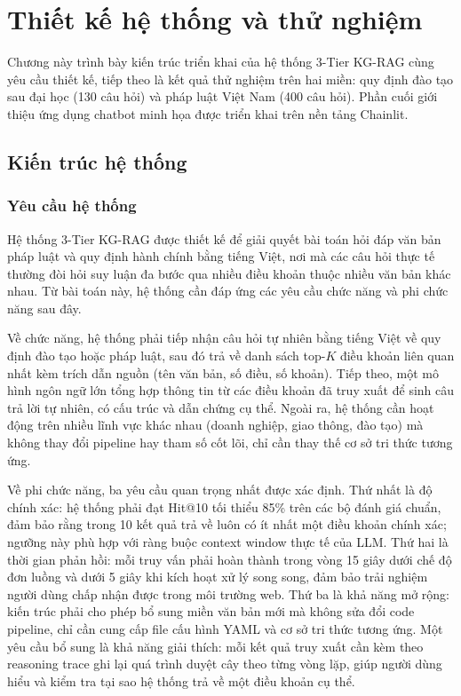 \chapter{Thiết kế hệ thống và thử nghiệm}
\label{chap:chapter4}

Chương này trình bày kiến trúc triển khai của hệ thống 3-Tier KG-RAG cùng yêu cầu
thiết kế, tiếp theo là kết quả thử nghiệm trên hai miền: quy định đào tạo sau đại học (130
câu hỏi) và pháp luật Việt Nam (400 câu hỏi). Phần cuối giới thiệu ứng dụng chatbot
minh họa được triển khai trên nền tảng Chainlit.

\section{Kiến trúc hệ thống}
\label{sec:kien-truc-he-thong}

\subsection{Yêu cầu hệ thống}
\label{subsec:yeu-cau-he-thong}

Hệ thống 3-Tier KG-RAG được thiết kế để giải quyết bài toán hỏi đáp văn bản pháp
luật và quy định hành chính bằng tiếng Việt, nơi mà các câu hỏi thực tế thường đòi hỏi
suy luận đa bước qua nhiều điều khoản thuộc nhiều văn bản khác nhau. Từ bài toán này,
hệ thống cần đáp ứng các yêu cầu chức năng và phi chức năng sau đây.

Về chức năng, hệ thống phải tiếp nhận câu hỏi tự nhiên bằng tiếng Việt về quy định
đào tạo hoặc pháp luật, sau đó trả về danh sách top-$K$ điều khoản liên quan nhất kèm
trích dẫn nguồn (tên văn bản, số điều, số khoản). Tiếp theo, một mô hình ngôn ngữ lớn
tổng hợp thông tin từ các điều khoản đã truy xuất để sinh câu trả lời tự nhiên, có cấu
trúc và dẫn chứng cụ thể. Ngoài ra, hệ thống cần hoạt động trên nhiều lĩnh vực khác
nhau (doanh nghiệp, giao thông, đào tạo) mà không thay đổi pipeline hay tham số
cốt lõi, chỉ cần thay thế cơ sở tri thức tương ứng.

Về phi chức năng, ba yêu cầu quan trọng nhất được xác định. Thứ nhất là độ chính
xác: hệ thống phải đạt Hit@10 tối thiểu 85\% trên các bộ đánh giá chuẩn, đảm bảo
rằng trong 10 kết quả trả về luôn có ít nhất một điều khoản chính xác; ngưỡng này phù
hợp với ràng buộc context window thực tế của LLM. Thứ hai là thời gian phản hồi:
mỗi truy vấn phải hoàn thành trong vòng 15 giây dưới chế độ đơn luồng và dưới 5 giây
khi kích hoạt xử lý song song, đảm bảo trải nghiệm người dùng chấp nhận được trong
môi trường web. Thứ ba là khả năng mở rộng: kiến trúc phải cho phép bổ sung miền
văn bản mới mà không sửa đổi code pipeline, chỉ cần cung cấp file cấu hình YAML và
cơ sở tri thức tương ứng. Một yêu cầu bổ sung là khả năng giải thích: mỗi kết quả truy
xuất cần kèm theo reasoning trace ghi lại quá trình duyệt cây theo từng vòng lặp, giúp
người dùng hiểu và kiểm tra tại sao hệ thống trả về một điều khoản cụ thể.

